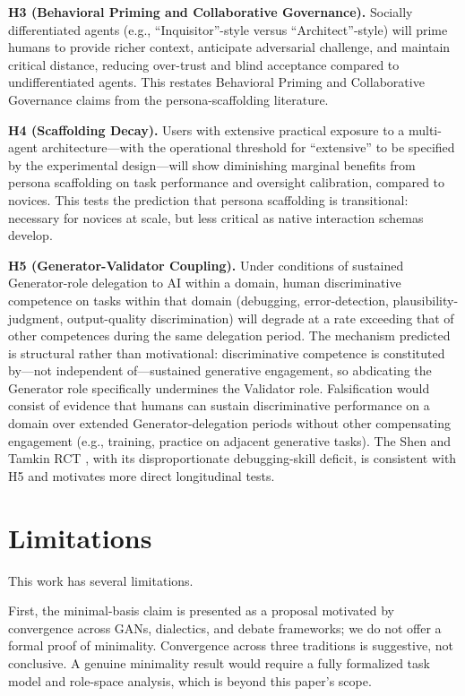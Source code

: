 \documentclass[11pt,a4paper]{article}
\begin{document}
\textbf{H3 (Behavioral Priming and Collaborative Governance).} Socially differentiated agents (e.g., ``Inquisitor''-style versus ``Architect''-style) will prime humans to provide richer context, anticipate adversarial challenge, and maintain critical distance, reducing over-trust and blind acceptance compared to undifferentiated agents. This restates Behavioral Priming and Collaborative Governance claims from the persona-scaffolding literature.

\textbf{H4 (Scaffolding Decay).} Users with extensive practical exposure to a multi-agent architecture---with the operational threshold for ``extensive'' to be specified by the experimental design---will show diminishing marginal benefits from persona scaffolding on task performance and oversight calibration, compared to novices. This tests the prediction that persona scaffolding is transitional: necessary for novices at scale, but less critical as native interaction schemas develop.

\textbf{H5 (Generator-Validator Coupling).} Under conditions of sustained Generator-role delegation to AI within a domain, human discriminative competence on tasks within that domain (debugging, error-detection, plausibility-judgment, output-quality discrimination) will degrade at a rate exceeding that of other competences during the same delegation period. The mechanism predicted is structural rather than motivational: discriminative competence is constituted by---not independent of---sustained generative engagement, so abdicating the Generator role specifically undermines the Validator role. Falsification would consist of evidence that humans can sustain discriminative performance on a domain over extended Generator-delegation periods without other compensating engagement (e.g., training, practice on adjacent generative tasks). The Shen and Tamkin RCT \citep{shen2026}, with its disproportionate debugging-skill deficit, is consistent with H5 and motivates more direct longitudinal tests.

\section{Limitations}
This work has several limitations.

First, the minimal-basis claim is presented as a proposal motivated by convergence across GANs, dialectics, and debate frameworks; we do not offer a formal proof of minimality. Convergence across three traditions is suggestive, not conclusive. A genuine minimality result would require a fully formalized task model and role-space analysis, which is beyond this paper's scope.
\end{document}
